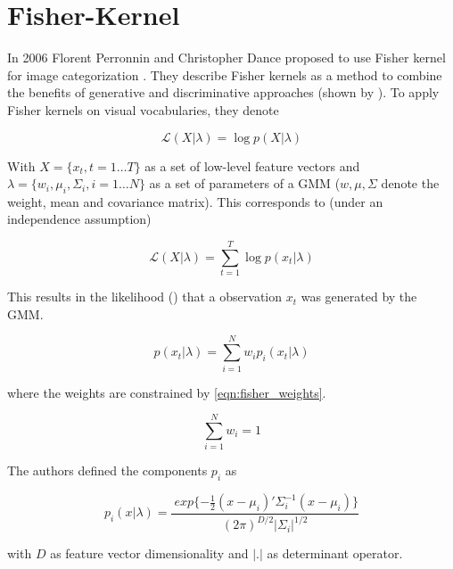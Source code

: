 \section{Fisher-Kernel}
\label{sec:fisher}

In 2006 Florent Perronnin and Christopher Dance proposed to use Fisher kernel for image categorization \cite{Perronnin2006}. They describe Fisher kernels as a method to combine the benefits of generative and discriminative approaches (shown by \cite{jaakkola1999exploiting}). To apply Fisher kernels on visual vocabularies, they denote

\begin{equation}
\mathcal{L} (X|\lambda) = \log p(X|\lambda)
\end{equation}

With $X = \{x_t, t = 1 \dots T\}$ as a set of low-level feature vectors and $\lambda = \{w_i, \mu_i, \Sigma_i, i = 1 \dots N\}$ as a set of parameters of a \acf{GMM} ($w, \mu, \Sigma$ denote the weight, mean and covariance matrix). This corresponds to (under an independence assumption)

\begin{equation}
\mathcal{L} (X|\lambda) = \sum_{t=1}^{T} \log p(x_t|\lambda)
\end{equation}

This results in the likelihood () that a observation $x_t$ was generated by the \ac{GMM}.

\begin{equation}
p(x_t|\lambda) = \sum_{i=1}^{N} w_i p_i (x_t|\lambda)
\label{eqn:fisher_likelihood}
\end{equation}

where the weights are constrained by \ref{eqn:fisher_weights}.

\begin{equation}
\sum_{i=1}^{N} w_i = 1
\label{eqn:fisher_weights}
\end{equation}

The authors defined the components $p_i$ as

\begin{equation}
p_i(x|\lambda) = \frac{
	\ 	exp \{-\frac{1}{2} (x-\mu_i)' \Sigma_{i}^{-1} (x-\mu_i)\}
}{
	(2 \pi)^{D/2} | \Sigma_i |^{1/2}
}
\end{equation}

with $D$ as feature vector dimensionality and $|.|$ as determinant operator.
